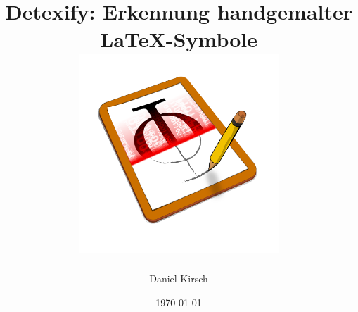 \documentclass[a5paper, headsepline, bibtotoc]{scrbook}
\begin{document}
\titlehead{{\Large Westfälische Wilhelms-Universität Münster \hfill Institut für Informatik}}
\title{Detexify: Erkennung handgemalter \LaTeX-Symbole \\
\vspace{5mm} \includegraphics[height=7.5cm]{figures/icon.png} }

\subject{Diplomarbeit}
\author{Daniel Kirsch}
\date{\today}
\publishers{Betreut durch Prof. Dr. Xiaoyi Jiang}

\maketitle

\frontmatter


\pagestyle{empty}
\cleardoublepage

\pagestyle{empty}
\cleardoublepage


\pagestyle{headings}

\tableofcontents  %


\mainmatter






\appendix





\backmatter


\listoffigures    %
\listofalgorithms
\end{document}
